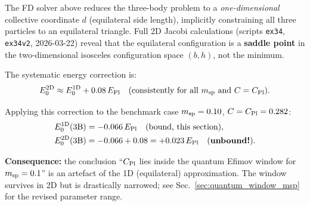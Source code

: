 \begin{remark}%
\label{rem:2d_correction}
The FD solver above reduces the three-body problem to a \emph{one-dimensional}
collective coordinate $d$ (equilateral side length), implicitly constraining
all three particles to an equilateral triangle.  Full 2D Jacobi calculations
(scripts \texttt{ex34}, \texttt{ex34v2}, 2026-03-22) reveal that the
equilateral configuration is a \textbf{saddle point} in the two-dimensional
isosceles configuration space $(b, h)$, not the minimum.

The systematic energy correction is:
\begin{equation}
  E_0^{\rm 2D} \approx E_0^{\rm 1D} + 0.08\,E_{\rm Pl}
  \quad\text{(consistently for all $m_{\rm sp}$ and $C = C_{\rm Pl}$).}
\end{equation}

Applying this correction to the benchmark case $m_{\rm sp}=0.10$,
$C = C_{\rm Pl} = 0.282$:
\begin{align}
  E_0^{\rm 1D}({\rm 3B}) &= -0.066\,E_{\rm Pl} \quad\text{(bound, this section)},\\
  E_0^{\rm 2D}({\rm 3B}) &= -0.066 + 0.08 = +0.023\,E_{\rm Pl} \quad\text{(\textbf{unbound!})}.
\end{align}

\noindent\textbf{Consequence:} the conclusion
``$C_{\rm Pl}$ lies inside the quantum Efimov window for $m_{\rm sp}=0.1$''
is an artefact of the 1D (equilateral) approximation.  The window
survives in 2D but is drastically narrowed; see
Sec.~\ref{sec:quantum_window_msp} for the revised parameter range.
\end{remark}
